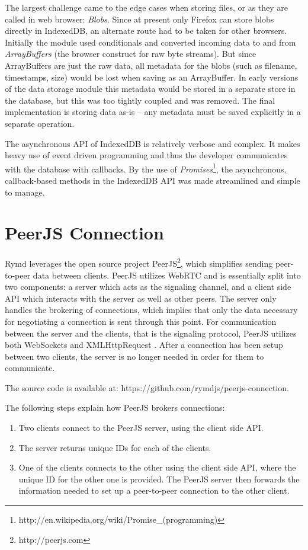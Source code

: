 The largest challenge came to the edge cases when storing files, or as they are called in web browser: \emph{Blobs}. Since at present only Firefox can store blobs directly in IndexedDB, an alternate route had to be taken for other browsers. Initially the module used conditionals and converted incoming data to and from \emph{ArrayBuffers} (the browser construct for raw byte streams). But since ArrayBuffers are just the raw data, all metadata for the blobs (such as filename, timestamps, size) would be lost when saving as an ArrayBuffer. In early versions of the data storage module this metadata would be stored in a separate store in the database, but this was too tightly coupled and was removed. The final implementation is storing data as-is – any metadata must be saved explicitly in a separate operation.

The asynchronous API of IndexedDB is relatively verbose and complex. It makes heavy use of event driven programming and thus the developer communicates with the database with callbacks. By the use of \emph{Promises}\footnote{http://en.wikipedia.org/wiki/Promise\_(programming)}, the asynchronous, callback-based methods in the IndexedDB API was made streamlined and simple to manage.

\section{PeerJS Connection}
\label{sec:p2p}


Rymd leverages the open source project PeerJS\footnote{http://peerjs.com}, which simplifies sending peer-to-peer data between clients. PeerJS utilizes WebRTC and is essentially split into two components: a server which acts as the signaling channel, and a client side API which interacts with the server as well as other peers. The server only handles the brokering of connections, which implies that only the data necessary for negotiating a connection is sent through this point. For communication between the server and the clients, that is the signaling protocol, PeerJS utilizes both WebSockets and XMLHttpRequest \cite{PeerjsGithub:2014:Online}. After a connection has been setup between two clients, the server is no longer needed in order for them to communicate.

The source code is available at: https://github.com/rymdjs/peerjs-connection.

The following steps explain how PeerJS brokers connections:
\begin{enumerate}
\item Two clients connect to the PeerJS server, using the client side API.
\item The server returns unique IDs for each of the clients.
\item One of the clients connects to the other using the client side API, where the unique ID for the other one is provided. The PeerJS server then forwards the information needed to set up a peer-to-peer connection to the other client.
\end{enumerate}

